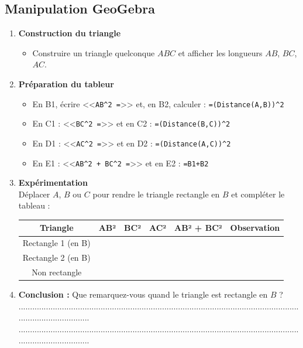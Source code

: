 \subsection*{Manipulation GeoGebra}

\begin{enumerate}
	\item \textbf{Construction du triangle}
	\begin{itemize}
		\item Construire un triangle quelconque $ABC$ et afficher les longueurs $AB$, $BC$, $AC$.
	\end{itemize}
	
	\item \textbf{Préparation du tableur}
	\begin{itemize}
		\item En B1, écrire <<\texttt{AB\string^2 =}>> et, en B2, calculer : \texttt{=(Distance(A,B))\string^2}
		\item En C1 : <<\texttt{BC\string^2 =}>> et en C2 : \texttt{=(Distance(B,C))\string^2}
		\item En D1 : <<\texttt{AC\string^2 =}>> et en D2 : \texttt{=(Distance(A,C))\string^2}
		\item En E1 : <<\texttt{AB\string^2 + BC\string^2 =}>> et en E2 : \texttt{=B1+B2}
	\end{itemize}
	
	\item \textbf{Expérimentation}\\
	Déplacer $A$, $B$ ou $C$ pour rendre le triangle rectangle en $B$ et compléter le tableau :
	
	\begin{center}
		\begin{tabular}{|c|c|c|c|c|l|}
			\hline
			\textbf{Triangle} & \textbf{AB²} & \textbf{BC²} & \textbf{AC²} & \textbf{AB² + BC²} & \textbf{Observation} \\
			\hline
			Rectangle 1 (en B)& & & & & \\
			\hline
			Rectangle 2 (en B)& & & & & \\
			\hline
			Non rectangle & & & & & \\
			\hline
		\end{tabular}
	\end{center}
	
	\item \textbf{Conclusion :} Que remarquez-vous quand le triangle est rectangle en $B$ ?\\
	..........................................................................................................................................................\\
	..........................................................................................................................................................
\end{enumerate}

